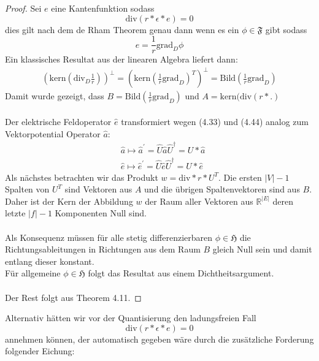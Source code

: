 \documentclass[11pt,a4paper,leqno]{report}
\numberwithin{equation}{chapter}
\begin{document}
\begin{proof}
	Sei $e$ eine Kantenfunktion sodass 
	\begin{equation*}
		\text{div}(r * \epsilon * e) = 0
	\end{equation*} dies gilt nach dem de Rham Theorem genau dann wenn es ein $\phi\in\mathfrak{F}$ gibt sodass 
\begin{equation*}
	e = \frac{1}{r}\text{grad}_D\phi
\end{equation*}
Ein klassisches Resultat aus der linearen Algebra liefert dann:
\begin{align*}
	 (\text{kern} (\text{div}_D\frac{1}{r}))^\perp 
	 =(\text{kern}(\frac{1}{r}\text{grad}_D)^T)^\perp =\text{Bild}(\frac{1}{r}\text{grad}_D)
\end{align*}
Damit wurde gezeigt, dass $B=\text{Bild}(\frac{1}{r}\text{grad}_D)$ und $A=\text{kern}(\text{div}(r*.)$\\
\\
Der elektrische Feldoperator $\hat{e}$ transformiert wegen (4.33) und (4.44) analog zum Vektorpotential Operator $\hat{a}$:
\begin{align}
	&\hat{a} \mapsto \hat{a}^{'} = \hat{U}\hat{a}\hat{U}^\dagger = U * \hat{a}\\
	&\hat{e} \mapsto \hat{e}^{'} = \hat{U}\hat{e}\hat{U}^\dagger = U * \hat{e}
\end{align}
Als n\"achstes betrachten wir das Produkt $w = \text{div} * r * U^T$.
Die ersten $|V| - 1$ Spalten von $U^T$ sind Vektoren aus $A$ und die \"ubrigen Spaltenvektoren sind aus $B$. Daher ist der Kern der Abbildung $w$ der Raum aller Vektoren aus $\mathbb{R}^{|E|}$ deren letzte $|f| - 1$ Komponenten Null sind.\\
\\
Als Konsequenz m\"ussen f\"ur alle stetig differenzierbaren $\phi\in\mathfrak{H}$ die Richtungsableitungen in Richtungen aus dem Raum $B$ gleich Null sein und damit entlang dieser konstant.\\
F\"ur allgemeine $\phi\in\mathfrak{H}$ folgt das Resultat aus einem Dichtheitsargument.\\
\\
Der Rest folgt aus Theorem 4.11.
\end{proof}
\noindent
Alternativ h\"atten wir vor der Quantisierung den ladungsfreien Fall
 \begin{equation}
 	\text{div}(r * \epsilon * e) = 0
 \end{equation}
 annehmen k\"onnen, der automatisch gegeben w\"are durch die zus\"atzliche Forderung folgender Eichung:
\end{document}
